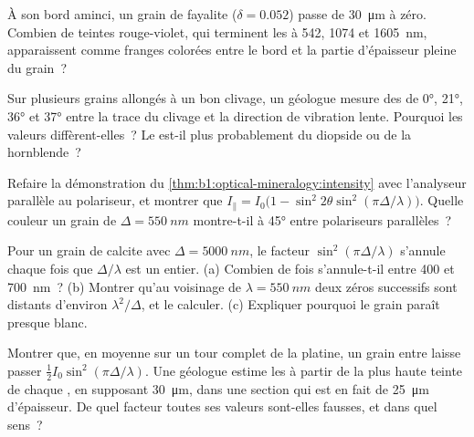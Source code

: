 \begin{exercise}[$\star\star$]\label{exo:b1:optical-mineralogy:8}
À son bord aminci, un grain de fayalite ($\delta = 0.052$) passe de
\qty{30}{\micro m} à zéro. Combien de teintes rouge-violet, qui terminent les
 à 542, 1074 et \qty{1605}{nm}, apparaissent comme franges colorées entre
le bord et la partie d'épaisseur pleine du grain~?
\end{exercise}

\begin{exercise}[$\star\star$]\label{exo:b1:optical-mineralogy:9}
Sur plusieurs grains allongés à un bon clivage, un géologue mesure des  de \ang{0}, \ang{21}, \ang{36} et \ang{37} entre la trace du clivage
et la direction de vibration lente. Pourquoi les valeurs diffèrent-elles~? Le
 est-il plus probablement du diopside ou de la hornblende~?
\end{exercise}

\begin{exercise}[$\star\star\star$]\label{exo:b1:optical-mineralogy:10}
Refaire la démonstration du \cref{thm:b1:optical-mineralogy:intensity} avec
l'analyseur parallèle au polariseur, et montrer que
$I_\parallel = I_0\bigl(1 - \sin^2 2\theta\sin^2(\pi\Delta/\lambda)\bigr)$.
Quelle couleur un grain de $\Delta = \qty{550}{nm}$ montre-t-il à \ang{45}
entre polariseurs parallèles~?
\end{exercise}

\begin{exercise}[$\star\star\star$]\label{exo:b1:optical-mineralogy:11}
Pour un grain de calcite avec $\Delta = \qty{5000}{nm}$, le facteur
$\sin^2(\pi\Delta/\lambda)$ s'annule chaque fois que $\Delta/\lambda$ est un
entier. (a) Combien de fois s'annule-t-il entre \num{400} et
\qty{700}{nm}~? (b) Montrer qu'au voisinage de $\lambda = \qty{550}{nm}$ deux
zéros successifs sont distants d'environ $\lambda^2/\Delta$, et le calculer. (c)
Expliquer pourquoi le grain paraît presque blanc.
\end{exercise}

\begin{exercise}[$\star\star\star$]\label{exo:b1:optical-mineralogy:12}
Montrer que, en moyenne sur un tour complet de la platine, un grain entre
 laisse passer $\frac12 I_0\sin^2(\pi\Delta/\lambda)$. Une
géologue estime les  à partir de la plus haute teinte de chaque
, en supposant \qty{30}{\micro m}, dans une section qui est en fait de
\qty{25}{\micro m} d'épaisseur. De quel facteur toutes ses valeurs sont-elles
fausses, et dans quel sens~?
\end{exercise}

